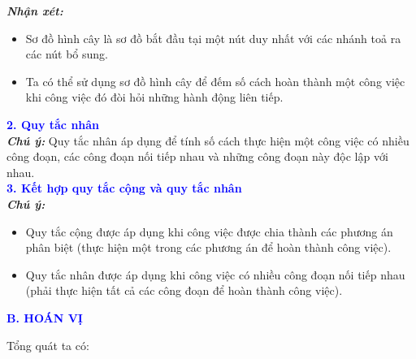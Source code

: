 \documentclass[12pt,a4paper]{extarticle}
\begin{document}
\noindent \textbf{\textit{Nhận xét:}}
\begin{itemize}
    \item Sơ đồ hình cây là sơ đồ bắt đầu tại một nút duy nhất với các nhánh toả ra các nút bổ sung.
    \item Ta có thể sử dụng sơ đồ hình cây để đếm số cách hoàn thành một công việc khi công việc đó đòi hỏi những hành động liên tiếp.
\end{itemize}

\vspace{0.5cm}
\noindent \textbf{\textcolor{blue}{2. Quy tắc nhân}}\\
\vspace{0.1cm}
\noindent{}
\vspace{0.2cm}
\noindent \textbf{\textit{Chú ý:}} Quy tắc nhân áp dụng để tính số cách thực hiện một công việc có nhiều công đoạn, các công đoạn nối tiếp nhau và những công đoạn này độc lập với nhau.\\
\vspace{0.2cm}
\vspace{0.5cm}
\noindent \textbf{\textcolor{blue}{3. Kết hợp quy tắc cộng và quy tắc nhân}}\\
\noindent \textbf{\textit{Chú ý:}}
\begin{itemize}
    \item Quy tắc cộng được áp dụng khi công việc được chia thành các phương án phân biệt (thực hiện một trong các phương án để hoàn thành công việc).
    \item Quy tắc nhân được áp dụng khi công việc có nhiều công đoạn nối tiếp nhau (phải thực hiện tất cả các công đoạn để hoàn thành công việc).
\end{itemize}
\noindent \textbf{\textcolor{blue}{\large B. HOÁN VỊ}}

\noindent Tổng quát ta có:
\end{document}

